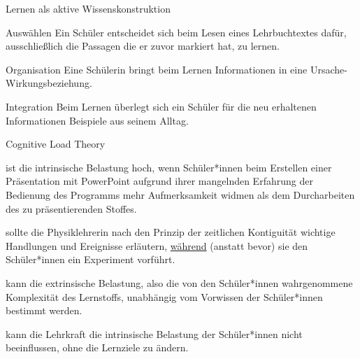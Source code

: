 \begin{mapping}{Lernen als aktive Wissenskonstruktion}
    \begin{answer}
        Auswählen
        \ismappedto
        Ein Schüler entscheidet sich beim Lesen eines Lehrbuchtextes dafür, ausschließlich die Passagen die er zuvor markiert hat, zu lernen.
    \end{answer}
    \begin{answer}
        Organisation
        \ismappedto
        Eine Schülerin bringt beim Lernen Informationen in eine Ursache-Wirkungsbeziehung.
    \end{answer}
    \begin{answer}
        Integration
        \ismappedto
        Beim Lernen überlegt sich ein Schüler für die neu erhaltenen Informationen Beispiele aus seinem Alltag.
    \end{answer}
\end{mapping}

\begin{multiple-choice}{Cognitive Load Theory}
    \begin{answers}
        \item[\correct] ist die intrinsische Belastung hoch, wenn Schüler*innen beim Erstellen einer Präsentation mit PowerPoint aufgrund ihrer mangelnden Erfahrung der Bedienung des Programms mehr Aufmerksamkeit widmen als dem Durcharbeiten des zu präsentierenden Stoffes.
        \item[\correct] sollte die Physiklehrerin nach den Prinzip der zeitlichen Kontiguität wichtige Handlungen und Ereignisse erläutern, \underline{während} (anstatt bevor) sie den Schüler*innen ein Experiment vorführt.
        \item[\wrong] kann die extrinsische Belastung, also die von den Schüler*innen wahrgenommene Komplexität des Lernstoffs, unabhängig vom Vorwissen der Schüler*innen bestimmt werden.
        \item[\wrong] kann die Lehrkraft die intrinsische Belastung der Schüler*innen nicht beeinflussen, ohne die Lernziele zu ändern.
    \end{answers}
\end{multiple-choice}

